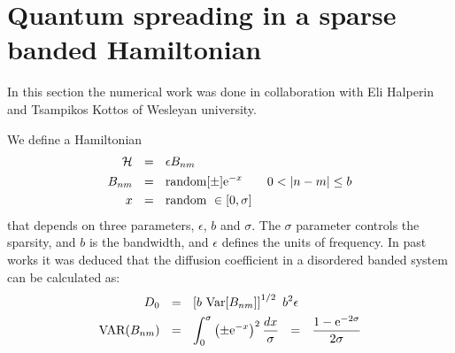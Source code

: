 {\begin{comment}
           In (\subref{fig:PN_kottos_pinning}) and (\subref{fig:ev_dist})
           we see the effects of diagonal disorder (pinning)
           on the spectrum. We see clearly that the lowest eigenvalues 
           are affected, and their corresponding PN is much lower. The spectrum
           reveals sub-diffusive behavior.
           In (\subref{fig:PN_g_scatter}) we compare the Thouless conductance
           $g$ with the participation number. 
           The presented points do seem to be correlated, but due to numerical issues,
           many values of $g$ are below the precision limit (seen as a vertical line in the plot), 
           up to $936$ from $1000$ for $\sigma=10$. 
           In (\subref{fig:spectral}) we compare $G_{DC\textrm{-spectral}}$ and $G_{DC\textrm{-Kirchoff}}$
           for a model with $b=10$ and $\sigma\in [0,80]$. They are correlated but unequal.
  }\label{fig:pta}
\end{figure}

\notbool{showfigure}{\end{comment}}{}





\section{Quantum spreading in a sparse banded Hamiltonian}\label{sec:dts}

In this section the numerical work was done in collaboration with
Eli Halperin and Tsampikos Kottos of Wesleyan university.


We define a Hamiltonian
\begin{align}
\mathcal{H}\ \ &=\ \ \epsilon B_{nm}\\
B_{nm} \ \ &= \ \ \textrm{random}[\pm]\eexp{-x}\qquad 0<|n-m| \le b \\
x \ \ &= \ \ \textrm{random} \ \in [0,\sigma]
\end{align}
that depends on three parameters, $\epsilon$, $b$ and $\sigma$. The $\sigma$
parameter controls the sparsity, and $b$ is the bandwidth, and $\epsilon$
defines the units of frequency.
In past works \cite{cohen_wave_2000,stotland_random-matrix_2010} it was deduced that the diffusion coefficient 
in a disordered banded system can be calculated as:
\begin{align}
D_0 \ \ &=\ \ \left[b\ \textrm{Var}[B_{nm}]\right]^{1/2}\ b^2\epsilon \\
\textrm{VAR}(B_{nm}) \ \ &=\ \ \int_0^\sigma \left(\pm \eexp{-x}\right)^2 \frac{dx}{\sigma}\ \ 
 =\ \  \frac{1-\eexp{-2\sigma}}{2\sigma} 
\end{align}

